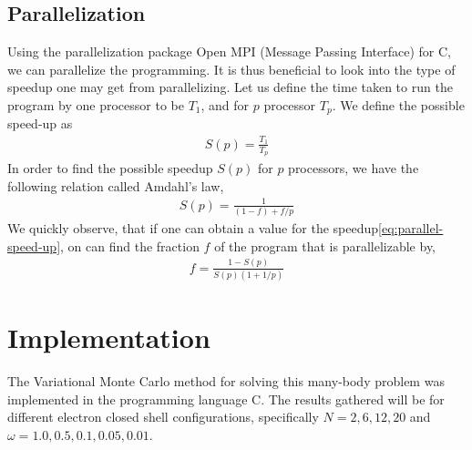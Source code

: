 \documentclass[11pt]{article}
\newcommand{\husk}[1]{\color{red} #1 \color{black}}
\newcommand{\CC}{C\nolinebreak\hspace{-.05em}\raisebox{.4ex}{\tiny\bf +}\nolinebreak\hspace{-.10em}\raisebox{.4ex}{\tiny\bf +}}
\def\CC{{C\nolinebreak[4]\hspace{-.05em}\raisebox{.4ex}{\tiny\bf ++}}}
\begin{document}
\subsection{Parallelization}
Using the parallelization package Open MPI (Message Passing Interface) for \CC, we can parallelize the programming. It is thus beneficial to look into the type of speedup one may get from parallelizing. Let us define the time taken to run the program by one processor to be $T_1$, and for $p$ processor $T_p$. We define the possible speed-up as
\begin{align}
	S(p) = \frac{T_1}{T_p}
	\label{eq:parallel-speed-up}
\end{align}
In order to find the possible speedup $S(p)$ for $p$ processors, we have the following relation called Amdahl's law\cite{Amdahl:1967:VSP:1465482.1465560},
\begin{align}
	S(p) = \frac{1}{(1-f) + f/p}
	\label{eq:amdahls-law}
\end{align}
We quickly observe, that if one can obtain a value for the speedup\eqref{eq:parallel-speed-up}, on can find the fraction $f$ of the program that is parallelizable by,
\begin{align}
	f = \frac{1-S(p)}{S(p)(1+1/p)}
	\label{eq:f-parallelizable-fraction}
\end{align}

\section{Implementation}
The Variational Monte Carlo method for solving this many-body problem was implemented in the programming language \CC. The results gathered will be for different electron closed shell configurations, specifically $N = 2, 6, 12, 20$ and $\omega = 1.0, 0.5, 0.1, 0.05, 0.01$.


\end{document}

